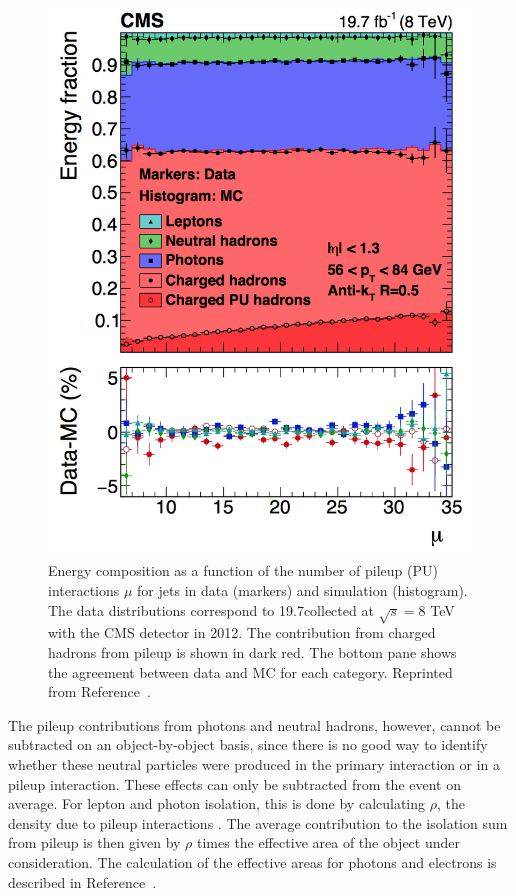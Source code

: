  \begin{figure}[h!]
	\centering
	\includegraphics[width=0.65\linewidth]{Figures/EventReconstruction/jetComp.png}
       \caption{Energy composition as a function of the number of pileup (PU) interactions $\mu$ for jets in 
       data (markers) and simulation (histogram). The data distributions correspond to 19.7\fbinv collected at 
       $\sqrt{s} = 8$ TeV with the CMS detector in 2012.
       The contribution from charged hadrons from pileup is shown in dark red.
       The bottom pane shows the agreement between data and MC for each category.
       Reprinted from Reference~\cite{ParticleFlow}.}
       \label{fig:jetComp}
\end{figure}

The pileup contributions from photons and neutral hadrons, however, cannot be subtracted on an object-by-object basis, since there is no good way to identify whether these neutral particles were produced in the primary interaction or in a pileup interaction. These effects can only be subtracted from the event on average. For lepton and photon isolation, this is done by calculating $\rho$, the \pt density due to pileup interactions \cite{XX}. The average contribution to the isolation sum from pileup is then given by $\rho$ times the effective area of the object under consideration. The calculation of the effective areas for photons and electrons is described in Reference~\cite{XX}.



